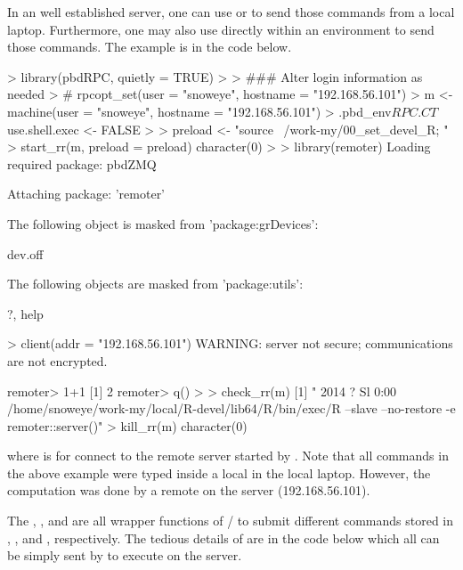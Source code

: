 In an well established server, one can use  or 
to send those commands from a local laptop.
Furthermore, one may also use  directly within an 
environment to send those commands. The example is in the code below.
\begin{Code}[title=Using \pkg{pbdRPC} to control \pkg{remoter}]
> library(pbdRPC, quietly = TRUE)
>
> ### Alter login information as needed
> # rpcopt_set(user = "snoweye", hostname = "192.168.56.101")
> m <- machine(user = "snoweye", hostname = "192.168.56.101")
> .pbd_env$RPC.CT$use.shell.exec <- FALSE
>
> preload <- "source ~/work-my/00_set_devel_R; "
> start_rr(m, preload = preload)
character(0)
>
> library(remoter)
Loading required package: pbdZMQ

Attaching package: 'remoter'

The following object is masked from 'package:grDevices':

    dev.off

The following objects are masked from 'package:utils':

    ?, help

> client(addr = "192.168.56.101")
WARNING: server not secure; communications are not encrypted.

remoter> 1+1
[1] 2 
remoter> q()
>
> check_rr(m)
[1] " 2014 ?        Sl     0:00 /home/snoweye/work-my/local/R-devel/lib64/R/bin/exec/R --slave --no-restore -e remoter::server()"
> kill_rr(m)
character(0)
\end{Code}
where  is for connect to the remote  server
started by .
Note that all commands in the above example were typed inside a
local  in the local laptop. However, the computation
 was done by a remote  on the server (192.168.56.101).

The , , and  are
all wrapper functions of / to submit different commands stored in
, , and
, respectively.
The tedious details of  are in the code below which all can be
simply sent by  to execute on the server.

